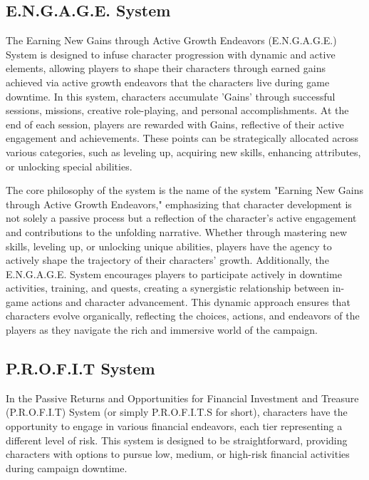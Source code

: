 \subsection{E.N.G.A.G.E. System}

The Earning New Gains through Active Growth Endeavors (E.N.G.A.G.E.) System is designed to infuse character progression with dynamic and active elements, allowing players to shape their characters through earned gains achieved via active growth endeavors that the characters live during game downtime. In this system, characters accumulate 'Gains' through successful sessions, missions, creative role-playing, and personal accomplishments. At the end of each session, players are rewarded with Gains, reflective of their active engagement and achievements. These points can be strategically allocated across various categories, such as leveling up, acquiring new skills, enhancing attributes, or unlocking special abilities.

The core philosophy of the system is the name of the system "Earning New Gains through Active Growth Endeavors," emphasizing that character development is not solely a passive process but a reflection of the character's active engagement and contributions to the unfolding narrative. Whether through mastering new skills, leveling up, or unlocking unique abilities, players have the agency to actively shape the trajectory of their characters' growth. Additionally, the E.N.G.A.G.E. System encourages players to participate actively in downtime activities, training, and quests, creating a synergistic relationship between in-game actions and character advancement. This dynamic approach ensures that characters evolve organically, reflecting the choices, actions, and endeavors of the players as they navigate the rich and immersive world of the campaign.

\subsection{P.R.O.F.I.T System}

In the Passive Returns and Opportunities for Financial Investment and Treasure (P.R.O.F.I.T) System (or simply P.R.O.F.I.T.S for short), characters have the opportunity to engage in various financial endeavors, each tier representing a different level of risk. This system is designed to be straightforward, providing characters with options to pursue low, medium, or high-risk financial activities during campaign downtime.

